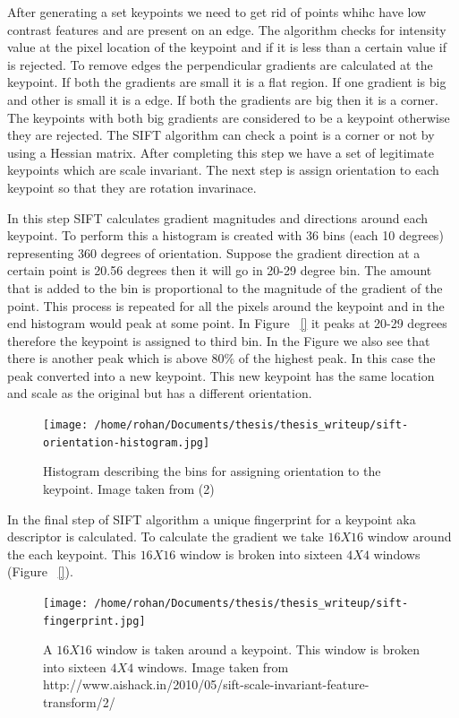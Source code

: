 \documentclass[12pt,draft]{dalcsthesis}
\begin{document}
After generating a set keypoints we need to get rid of points whihc have low contrast features and are present on an edge. The algorithm checks for intensity value at the pixel location of the keypoint and if it is less than a certain value if is rejected. To remove edges the perpendicular gradients are calculated at the keypoint. If both the gradients are small it is a flat region. If one gradient is big and other is small it is a edge. If both the gradients are big then it is a corner. The keypoints with both big gradients are considered to be a keypoint otherwise they are rejected. The SIFT algorithm can check a point is a corner or not by using a Hessian matrix. After completing this step we have a set of legitimate keypoints which are scale invariant. The next step is assign orientation to each keypoint so that they are rotation invarinace. 

In this step SIFT calculates gradient magnitudes and directions around each keypoint. To perform this a histogram is created with 36 bins (each 10 degrees) representing 360 degrees of orientation. Suppose the gradient direction at a certain point is 20.56 degrees then it will go in 20-29 degree bin. The amount that is added to the bin is proportional to the magnitude of the gradient of the point. This process is repeated for all the pixels around the keypoint and in the end histogram would peak at some point. In Figure ~\ref{} it peaks at 20-29 degrees therefore the keypoint is assigned to third bin. In the Figure we also see that there is another peak which is above $80 \%$ of the highest peak. In this case the peak converted into a new keypoint. This new keypoint has the same location and scale as the original but has a different orientation. 

\begin{figure}
  \centering
     {\texttt{[image: /home/rohan/Documents/thesis/thesis\_writeup/sift-orientation-histogram.jpg]}}
  \caption{\label{fig- sift bin histogram} Histogram describing the bins for assigning orientation to the keypoint. Image taken from (2)}
\end{figure}

In the final step of SIFT algorithm a unique fingerprint for a keypoint aka descriptor is calculated. To calculate the gradient we take $16 X 16$ window around the each keypoint. This $16 X 16$ window is broken into sixteen $4 X4$ windows (Figure ~\ref{}).

\begin{figure}
  \centering
     {\texttt{[image: /home/rohan/Documents/thesis/thesis\_writeup/sift-fingerprint.jpg]}}
  \caption{\label{fig- sift bin fingerprint} A $16 X16$ window is taken around a keypoint. This window is broken into sixteen $4 X 4$ windows. Image taken from \cite{}{http://www.aishack.in/2010/05/sift-scale-invariant-feature-transform/2/} }
\end{figure}
\end{document}
